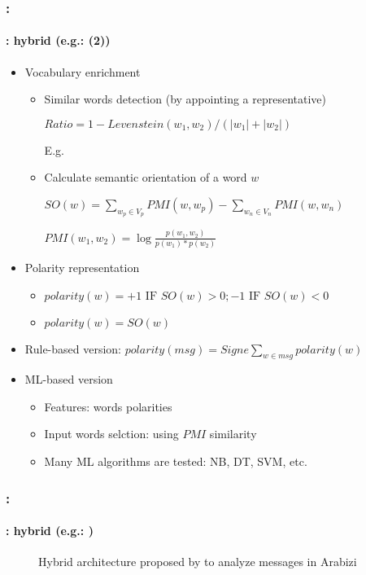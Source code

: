 \documentclass[xcolor=table]{beamer}
\begin{document}
\begin{frame}
	\frametitle{\insertshortsubtitle: \insertsection}
	\framesubtitle{\insertsubsection: hybrid (e.g.: \cite{18-bettiche-al} (2)) }
	
	\begin{itemize}
		\item Vocabulary enrichment
		\begin{itemize}
			\item Similar words detection (by appointing a representative)
			
			$Ratio = 1 - Levenstein(w_1, w_2)/(|w_1|+|w_2|)$
			
			E.g. 
			
			\item Calculate semantic orientation of a word $w$
			
			
			$SO(w) = \sum_{w_p \in V_p} PMI(w, w_p) - \sum_{w_n \in V_n} PMI(w, w_n)$
			
			$PMI (w_1, w_2) = \log \frac{p(w_1, w_2)}{p(w_1)*p(w_2)}$
		\end{itemize}
		\item Polarity representation
		\begin{itemize}
			\item $polarity(w) = +1 \text{ IF } SO(w) > 0; -1 \text{ IF } SO(w) < 0$
			\item $polarity(w) = SO(w)$
		\end{itemize}
		\item Rule-based version: $polarity(msg) = Signe \sum_{w \in msg} polarity(w)$
		\item ML-based version
		\begin{itemize}
			\item Features: words polarities
			\item Input words selction: using $PMI$ similarity
			\item Many ML algorithms are tested: NB, DT, SVM, etc.
		\end{itemize}
	\end{itemize}
	
\end{frame}

\begin{frame}
	\frametitle{\insertshortsubtitle: \insertsection}
	\framesubtitle{\insertsubsection: hybrid (e.g.: \cite{18-guellil-al})}
	
	\begin{figure}
		\centering
		\caption{Hybrid architecture proposed by \cite{18-guellil-al} to analyze messages in Arabizi}
	\end{figure}
	
\end{frame}
\end{document}
